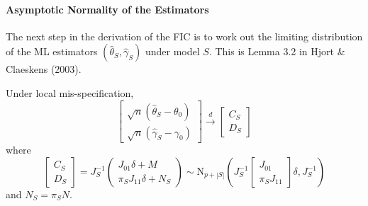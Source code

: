\paragraph{Asymptotic Normality of the Estimators}
The next step in the derivation of the FIC is to work out the limiting distribution of the ML estimators $(\widehat{\theta}_S, \widehat{\gamma}_S)$ under model $S$. 
This is Lemma 3.2 in Hjort \& Claeskens (2003).
\begin{lem}
\label{lem:main}
Under local mis-specification,
$$\left[\begin{array}{c}
\sqrt{n} (\hat{\theta}_S - \theta_0)\\
\sqrt{n} (\hat{\gamma}_S - \gamma_0)
\end{array}\right]\overset{d}{\rightarrow}
\left[\begin{array}{c}
C_S\\
D_S
\end{array}\right]$$
where
$$\left[\begin{array}{c}
C_S\\
D_S
\end{array}\right] = J_S^{-1}
\left(\begin{array}{c}
J_{01}\delta + M\\
\pi_S J_{11}\delta + N_S
\end{array}\right) \sim \mbox{N}_{p+|S|}
\left(J_S^{-1}\left[\begin{array}{c}
J_{01}\\
\pi_S J_{11}
\end{array}\right]\delta, J_S^{-1}\right)$$
and $N_S = \pi_S N$.
\end{lem}
